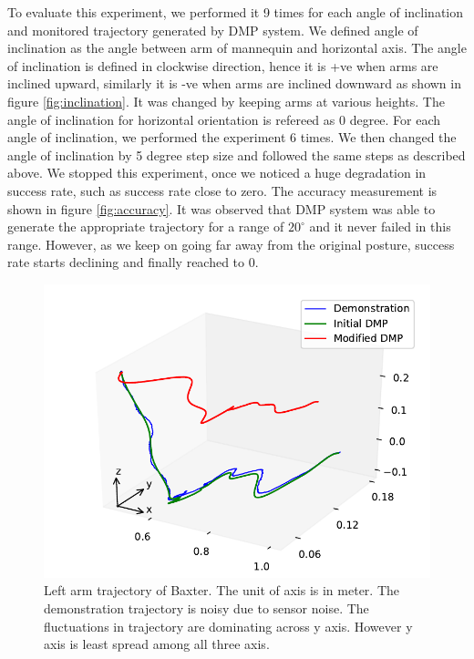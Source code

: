 \documentclass[sigconf]{acmart}
\begin{document}
To evaluate this experiment, we performed it 9 times for each angle of inclination and monitored trajectory generated by DMP system. We defined angle of inclination as the angle between arm of mannequin and horizontal axis. The angle of inclination is defined in clockwise direction, hence it is +ve when arms are inclined upward, similarly it is -ve when arms are inclined downward as shown in figure \ref{fig:inclination}. It was changed by keeping arms at various heights. The angle of inclination for horizontal  orientation is refereed as 0 degree. For each angle of inclination, we performed the experiment 6 times. We then changed the angle of inclination by 5 degree step size and followed the same steps as described above. We stopped this experiment, once we noticed a huge degradation in success rate, such as success rate close to zero. The accuracy measurement is shown in figure \ref{fig:accuracy}. It was observed that DMP system was able to generate the appropriate trajectory for a range of $20^\circ$ and it never failed in this range. However, as we keep on going far away from the original posture, success rate starts declining and finally reached to $0$. 

\begin{figure}
	\includegraphics[width=\linewidth]{all_traj}
	\caption{Left arm trajectory of Baxter. The unit of axis is in meter. The demonstration trajectory is noisy due to sensor noise. The fluctuations in trajectory are dominating across y axis. However y axis is least spread among all three axis.}
	\label{fig:trajectory}
\end{figure}
\end{document}
